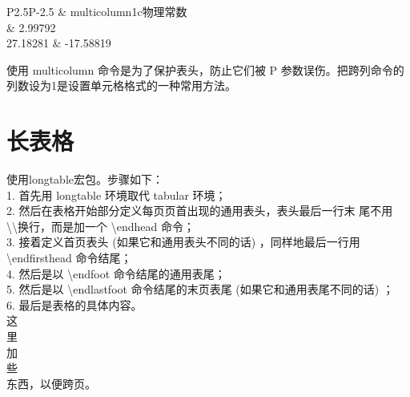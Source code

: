\documentclass[UTF8]{article}
\begin{document}
\begin{table}[htbp]
\centering
\begin{tabular}{P{2.5}P{-2.5}}
	\toprule
	 &
	multicolumn{1}{c}{物理常数} \\
	 & 2.99792 \\
	27.18281 & -17.58819 \\
	\bottomrule
\end{tabular}
\end{table}
使用 multicolumn 命令是为了保护表头，防止它们被 P 参数误伤。把跨列命令的列数设为1是设置单元格格式的一种常用方法。


\section{长表格}
使用longtable宏包。步骤如下：\\
1. 首先用 longtable 环境取代 tabular 环境；\\
2. 然后在表格开始部分定义每页页首出现的通用表头，表头最后一行末
尾不用 \textbackslash \textbackslash 换行，而是加一个 \textbackslash endhead 命令；\\
3. 接着定义首页表头 (如果它和通用表头不同的话) ，同样地最后一行用\textbackslash endfirsthead 命令结尾；\\
4. 然后是以 \textbackslash endfoot 命令结尾的通用表尾；\\
5. 然后是以 \textbackslash endlastfoot 命令结尾的末页表尾 (如果它和通用表尾不同的话) ；\\
6. 最后是表格的具体内容。\\
这\\里\\加\\些\\东西，以便跨页。
\end{document}
